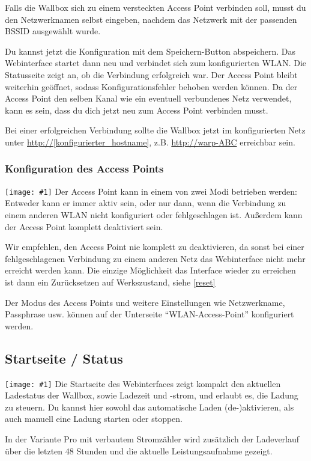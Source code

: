 \documentclass[a4paper,10pt]{article}
\newcommand{\hint}[1]{\begin{tcolorbox}[colback=boxgray,colframe=black,coltext=
white,title=Hinweis]#1\end{tcolorbox}}
\newcommand{\gfx}[1]{\texttt{[image: \#1]}}
\begin{document}
\begin{multicols*}{2}
	Falls die Wallbox sich zu einem versteckten Access Point verbinden soll, musst du den Netzwerknamen selbst eingeben,
	nachdem das Netzwerk mit der passenden BSSID ausgewählt wurde.

	Du kannst jetzt die Konfiguration mit dem Speichern-Button abspeichern.
	Das Webinterface startet dann neu und verbindet sich zum konfigurierten WLAN. Die Statusseite zeigt
	an, ob die Verbindung erfolgreich war. Der Access Point bleibt weiterhin
	geöffnet, sodass Konfigurationsfehler behoben werden können.
	Da der Access Point den selben Kanal wie ein eventuell verbundenes Netz verwendet,
	kann es sein, dass du dich jetzt neu zum Access Point verbinden musst.

	Bei einer erfolgreichen Verbindung sollte die Wallbox jetzt im konfigurierten Netz unter
	\url{http://[konfigurierter_hostname]}, z.B. \url{http://warp-ABC} erreichbar sein.

	\subsubsection{Konfiguration des Access Points}
	\gfx{./img_warp2/resized/web_wifi_ap}
	Der Access Point kann in einem von zwei Modi betrieben werden: Entweder kann er immer aktiv sein,
	oder nur dann, wenn die Verbindung zu einem anderen WLAN nicht konfiguriert oder fehlgeschlagen ist.
	Außerdem kann der Access Point komplett deaktiviert sein.
	\hint{Wir empfehlen, den Access Point nie komplett zu deaktivieren, da sonst bei einer
		fehlgeschlagenen Verbindung zu einem anderen Netz das Webinterface nicht mehr erreicht
		werden kann. Die einzige Möglichkeit das Interface wieder zu erreichen ist dann ein Zurücksetzen auf Werkszustand, siehe \ref{reset}}
	Der Modus des Access Points und weitere Einstellungen wie Netzwerkname, Passphrase usw. können
	auf der Unterseite \enquote{WLAN-Access-Point} konfiguriert werden.

	\subsection{Startseite / Status}
	\gfx{./img_warp2/resized/web_status}
	Die Startseite des Webinterfaces zeigt kompakt den aktuellen Ladestatus der
	Wallbox, sowie Ladezeit und -strom, und erlaubt es, die Ladung zu steuern.
	Du kannst hier sowohl das automatische Laden (de-)aktivieren, als auch
	manuell eine Ladung starten oder stoppen.

	In der Variante Pro mit verbautem Stromzähler wird zusätzlich der Ladeverlauf
	über die letzten 48 Stunden und die aktuelle Leistungsaufnahme gezeigt.


\end{multicols*}
\end{document}
